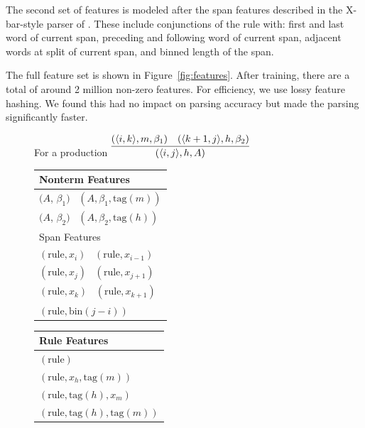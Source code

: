 \documentclass[11pt,letterpaper]{article}
\newcommand{\Span}[1]{\langle #1 \rangle}
\newcommand{\RuleSym}{\mathrm{rule}}
\newcommand{\BinFN}[1]{\mathrm{bin}({#1})}
\newcommand{\TagFN}[1]{\mathrm{tag}({#1})}
\newcommand{\WordFN}[1]{x_{#1}}
\begin{document}
The second set of features is modeled after the span features
described in the X-bar-style parser of . These
include conjunctions of the rule with: first and last word of current span,
 preceding and following word of current span, adjacent words at split of current span, and binned length of the span.

The full feature set is shown in Figure~\ref{fig:features}.  After
training, there are a total of around 2 million non-zero features.
For efficiency, we use lossy feature hashing. We found this had no
impact on parsing accuracy but made the parsing significantly faster.


\begin{figure}
  \footnotesize
  \centering
  For a production $ \infer{(\Span{i, j}, h, A)}{(\Span{i, k}, m, \beta_1) &  (\Span{k+1, j}, h, \beta_2)} $

  \vspace{-0.1cm}

  \begin{multicols}{2}

  \begin{tabular}{l}

  \toprule
  Nonterm Features \\
  \midrule

  
  $(A$, $\beta_1)$ \  $(A, \beta_1, \TagFN{m})$  \\
  $(A$, $\beta_2)$ \  $(A, \beta_2, \TagFN{h})$ \\


  
  \bottomrule
  \toprule
  Span Features \\
  \midrule

  
  $(\RuleSym, \WordFN{i})$ \ $(\RuleSym, \WordFN{i-1})$\\
  $(\RuleSym, \WordFN{j})$ \  $(\RuleSym, \WordFN{j+1})$\\
  $(\RuleSym, \WordFN{k})$ \  $(\RuleSym, \WordFN{k+1})$\\
  $(\RuleSym, \BinFN{j-i})$\\
  
  \bottomrule
  \end{tabular}

  \begin{tabular}{l}

  \toprule


  Rule Features \\
  
  \midrule

  $(\RuleSym  )$\\
  $(\RuleSym, \WordFN{h}, \TagFN{m})$ \\
  $(\RuleSym, \TagFN{h}, \WordFN{m})$ \\
  $(\RuleSym, \TagFN{h}, \TagFN{m})$ \\


\end{tabular}
\end{multicols}
\end{figure}
\end{document}
